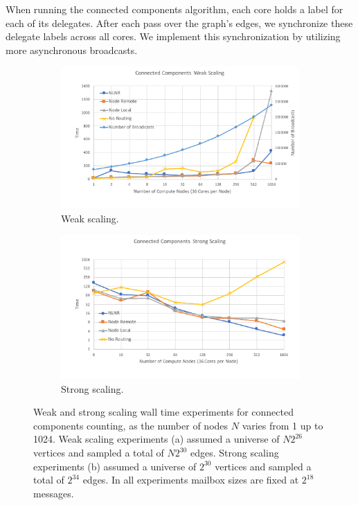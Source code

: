\documentclass[10]{report}
\begin{document}
When running the connected components algorithm, each core holds a label for each of its delegates.
After each pass over the graph's edges, we synchronize these delegate labels across all cores. 
We implement this synchronization by utilizing more asynchronous broadcasts.

\begin{figure}
	\begin{center}
		\begin{subfigure}{0.49\linewidth}
			\centerline{\includegraphics[width=1.0\columnwidth]{conn_comp_weak_scaling}}
			\caption{Weak scaling. \label{fig:conn_comp_weak_scaling}}
		\end{subfigure}
		\begin{subfigure}{0.49\linewidth}
			\centerline{\includegraphics[width=1.0\columnwidth]{conn_comp_strong_scaling}}
			\caption{Strong scaling. \label{fig:conn_comp_strong_scaling}}
		\end{subfigure}
		\caption{Weak and strong scaling wall time experiments for connected components counting, as the number of nodes $N$ varies from 1 up to 1024.
			Weak scaling experiments (a) assumed a universe of $N2^{26}$ vertices and sampled a total of $N2^{30}$ edges.
			Strong scaling experiments (b) assumed a universe of $2^{30}$ vertices and sampled a total of $2^{34}$ edges. 
			In all experiments mailbox sizes are fixed at $2^{18}$ messages.
			\label{fig:conn_comp_scaling}}
	\end{center}
\end{figure}
\end{document}
